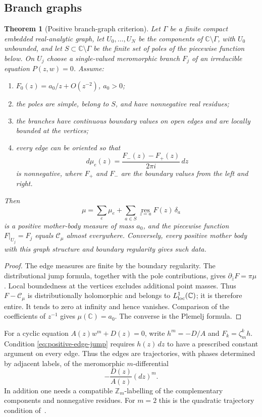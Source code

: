 \documentclass[reqno]{amsart}
\newtheorem{theorem}{Theorem}[section]
\theoremstyle{definition}
\theoremstyle{remark}
\newcommand{\bC}{\mathbb C}
\newcommand{\Cauchy}{\mathcal C}
\begin{document}
\subsection{Branch graphs}

\begin{theorem}[Positive branch-graph criterion]\label{thm:branch-graph}
Let $\Gamma$ be a finite compact embedded real-analytic graph, let
$U_0,\ldots,U_N$ be the components of $\bC\setminus\Gamma$, with $U_0$
unbounded, and let $S\subset\bC\setminus\Gamma$ be the finite set of poles of
the piecewise function below.  On $U_j$ choose a single-valued meromorphic
branch $F_j$ of an irreducible equation
$P(z,w)=0$.  Assume:
\begin{enumerate}[label=\textup{(\roman*)}]
\item $F_0(z)=a_0/z+O(z^{-2})$, $a_0>0$;
\item the poles are simple, belong to $S$, and have nonnegative real residues;
\item the branches have continuous boundary values on open edges and are
locally bounded at the vertices;
\item every edge can be oriented so that
\begin{equation}\label{eq:positive-edge-jump}
 d\mu_e(z)=\frac{F_-(z)-F_+(z)}{2\pi i}\,dz
\end{equation}
is nonnegative, where $F_+$ and $F_-$ are the boundary values from the left and
right.
\end{enumerate}
Then
\[
 \mu=\sum_e\mu_e+
 \sum_{a\in S}\operatorname*{res}_{z=a}F(z)\,\delta_a
\]
is a positive mother-body measure of mass $a_0$, and the piecewise function
$F|_{U_j}=F_j$ equals $\Cauchy_\mu$ almost everywhere.  Conversely, every
positive mother body with this graph structure and boundary regularity gives
such data.
\end{theorem}

\begin{proof}
The edge measures are finite by the boundary regularity.  The distributional
jump formula, together with the pole contributions, gives
$\partial_{\bar z}F=\pi\mu$.  Local boundedness at the vertices excludes
additional point masses.  Thus $F-\Cauchy_\mu$ is distributionally holomorphic
and belongs to $L^1_{\rm loc}(\bC)$; it is therefore entire.  It tends to zero at
infinity and hence vanishes.  Comparison of the coefficients of $z^{-1}$ gives
$\mu(\bC)=a_0$.  The converse is the Plemelj formula.
\end{proof}

For a cyclic equation $A(z)w^m+D(z)=0$, write $h^m=-D/A$ and
$F_k=\zeta_m^kh$.  Condition \eqref{eq:positive-edge-jump} requires
$h(z)\,dz$ to have a prescribed constant argument on every edge.  Thus the
edges are trajectories, with phases determined by adjacent labels, of the
meromorphic $m$-differential
\[
 -\frac{D(z)}{A(z)}(dz)^m.
\]
In addition one needs a compatible $\mathbb Z_m$-labelling of the complementary
components and nonnegative residues.  For $m=2$ this is the quadratic
trajectory condition of~\cite{BoSh}.
\end{document}
